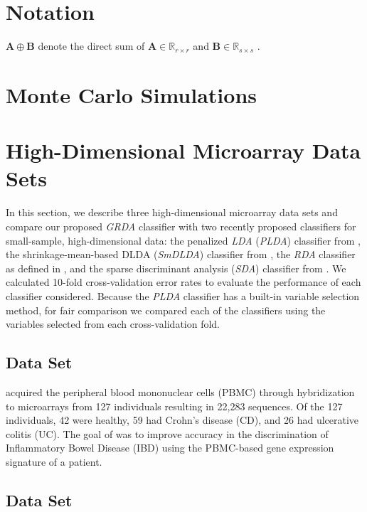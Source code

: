 \documentclass[11pt]{article}
\begin{document}
\section{Notation}

$\bm A \oplus \bm B$ denote the direct sum of $\bm A \in \mathbb{R}_{r \times r}$ and $\bm B \in \mathbb{R}_{s \times s}$ \citep[Chapter 1]{Lutkepohl:1996uz}.


\section{Monte Carlo Simulations}

\section{High-Dimensional Microarray Data Sets}

In this section, we describe three high-dimensional microarray data sets and compare our proposed \emph{GRDA} classifier with two recently proposed classifiers for small-sample, high-dimensional data: the penalized \emph{LDA} (\emph{PLDA}) classifier from \cite{Witten:2011kc}, the shrinkage-mean-based DLDA (\emph{SmDLDA}) classifier from \cite{Tong:2012hw}, the \emph{RDA} classifier as defined in \cite{Hastie:2008dt}, and the sparse discriminant analysis (\emph{SDA}) classifier from \cite{Clemmensen:2011kr}. We calculated 10-fold cross-validation error rates \citep{Hastie:2008dt} to evaluate the performance of each classifier considered. Because the \emph{PLDA} classifier has a built-in variable selection method, for fair comparison we compared each of the classifiers using the variables selected from each cross-validation fold.

\subsection{\cite{Burczynski:2006ik} Data Set}

\cite{Burczynski:2006ik} acquired the peripheral blood mononuclear cells (PBMC) through hybridization to microarrays from 127 individuals resulting in 22,283 sequences. Of the 127 individuals, 42 were healthy, 59 had Crohn's disease (CD), and 26 had ulcerative colitis (UC). The goal of \cite{Burczynski:2006ik} was to improve accuracy in the discrimination of Inflammatory Bowel Disease (IBD) using the PBMC-based gene expression signature of a patient.

\subsection{\cite{Nakayama:2007fl} Data Set}
\end{document}
